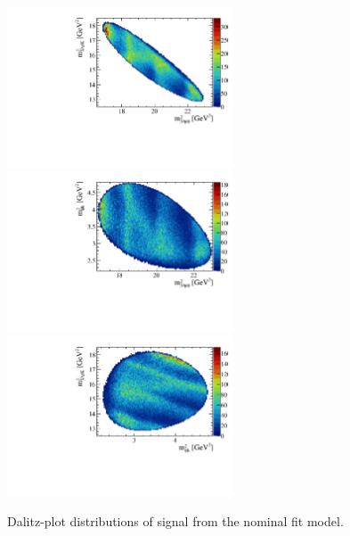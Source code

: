 \begin{figure}[!tbp]
\centering
\includegraphics[width=0.6\textwidth]{Figures/03_Zcs/06_Amplitude/dalitz/toy/mjpsik2_mjpsiphi2}
\includegraphics[width=0.6\textwidth]{Figures/03_Zcs/06_Amplitude/dalitz/toy/mphik2_mjpsiphi2}
\includegraphics[width=0.6\textwidth]{Figures/03_Zcs/06_Amplitude/dalitz/toy/mjpsik2_mphik2}
\caption{Dalitz-plot distributions of signal from the nominal fit model.}
\label{fig:sec5_dalitz_plot}
\end{figure}


